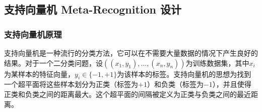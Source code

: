 
\subsection{支持向量机 Meta-Recognition 设计}

\subsubsection{支持向量机原理}
支持向量机是一种流行的分类方法，它可以在不需要大量数据的情况下产生良好的结果。对于一个二分类问题，设$((x_1,y_1),\dots,(x_n,y_n))$为训练数据集，其中$x_i$为某样本的特征向量，$y_i\in\{-1,+1\}$为该样本的标签。支持向量机的思想为找到一个超平面将这些样本划分为正类（标签为$+1$）和负类（标签为$-1$），并且使得正类和负类之间的距离最大。这个超平面的间隔被定义为正类与负类之间的最近距离。

